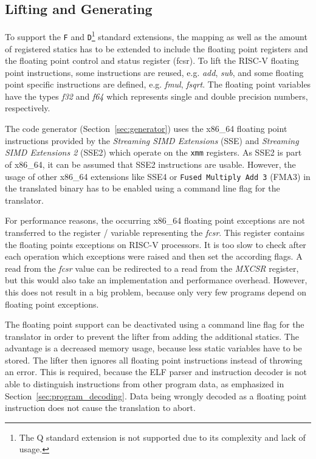 \documentclass[course=eragp]{aspdoc}
\begin{document}
\subsection{Lifting and Generating}

To support the \texttt{F} and \texttt{D}\footnote{The Q standard extension is not supported due to
    its complexity and lack of usage.}
standard extensions, the mapping as well as the amount of registered statics has to be extended to include the
floating point registers and the floating point control and status register (fcsr). To lift the
RISC-V floating point instructions, some instructions are reused, e.g. \emph{add}, \emph{sub}, and some floating
point specific instructions are defined, e.g. \emph{fmul}, \emph{fsqrt}. The floating point variables have the
types \emph{f32} and \emph{f64} which represents single and double precision numbers, respectively.

\par

The code generator (Section~\ref{sec:generator}) uses the x86\_64 floating point instructions
provided by the \textit{Streaming SIMD Extensions} (SSE) and \textit{Streaming SIMD Extensions 2}
(SSE2) which operate on the \texttt{xmm} registers. As SSE2 is part of x86\_64, it can be assumed
that SSE2 instructions are usable. However, the usage of other x86\_64 extensions like SSE4 or
\texttt{Fused Multiply Add 3} (FMA3) in the translated binary has to be enabled using a command line
flag for the translator.

\par

For performance reasons, the occurring x86\_64 floating point exceptions are not transferred to
the register / variable representing the \emph{fcsr}. This register contains the floating points exceptions on RISC-V
processors. It is too slow to check after each operation which exceptions were raised and then set
the according flags. A read from the \emph{fcsr} value can be redirected to a read from the \textit{MXCSR}
register, but this would also take an implementation and performance overhead. However, this does
not result in a big problem, because only very few programs depend on floating point exceptions.

\par

The floating point support can be deactivated using a command line flag for the translator in order to prevent the
lifter from adding the additional statics. The
advantage is a decreased memory usage, because less static variables have to be stored. The lifter
then ignores all floating point instructions instead of throwing an error. This is required,
because the ELF parser and instruction decoder is not able to distinguish instructions from other
program data, as emphasized in Section~\ref{sec:program_decoding}. Data being wrongly decoded as a
floating point instruction does not cause the translation to abort.
\end{document}
